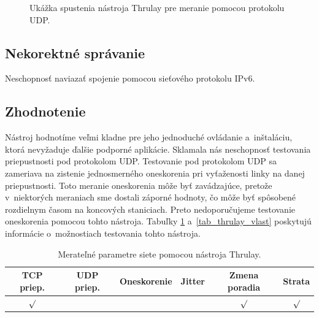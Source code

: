        \begin{figure}[H]
           \begin{center}
                   \caption{Ukážka spustenia nástroja Thrulay pre meranie
                   pomocou protokolu UDP.}
               \label{thrulay_udp}
           \end{center}
       \end{figure}

        \subsection{Nekorektné správanie} \label{thrulay_chyby}
        Neschopnosť naviazať spojenie pomocou sieťového protokolu IPv6.

        \subsection{Zhodnotenie} \label{thrulay_zhod}
        Nástroj hodnotíme veľmi kladne pre jeho jednoduché ovládanie
        a~inštaláciu, ktorá nevyžaduje ďalšie podporné aplikácie.
        Sklamala nás neschopnosť testovania priepustnosti pod protokolom
        UDP. Testovanie pod protokolom UDP sa 
        zameriava na zistenie jednosmerného oneskorenia pri vyťaženosti linky 
        na danej priepustnosti. Toto meranie oneskorenia môže byť zavádzajúce,
        pretože v~niektorých meraniach sme dostali záporné hodnoty, čo môže byť
        spôsobené rozdielnym časom na koncových staniciach. Preto nedoporučujeme
        testovanie oneskorenia pomocou tohto nástroja.
        Tabuľky \ref{tab_thrulay_param} a~\ref{tab_thrulay_vlast} poskytujú
        informácie o~možnostiach testovania tohto nástroja.

        \begin{table}[H]
            \begin{center}
                \begin{tabular}{|c|c|c|c|c|c|}
                    \hline
                    \textbf{TCP priep.}  &  \textbf{UDP priep.}  &
                    \textbf{Oneskorenie} & \textbf{Jitter} &
                    \textbf{Zmena poradia} & \textbf{Strata} \\
                    \hline
                    $\surd$ & & & & $\surd$ & $\surd$\\ 
                    \hline
                \end{tabular}
                \caption{Merateľné parametre siete pomocou nástroja Thrulay.}
                \label{tab_thrulay_param}
            \end{center}
        \end{table}

